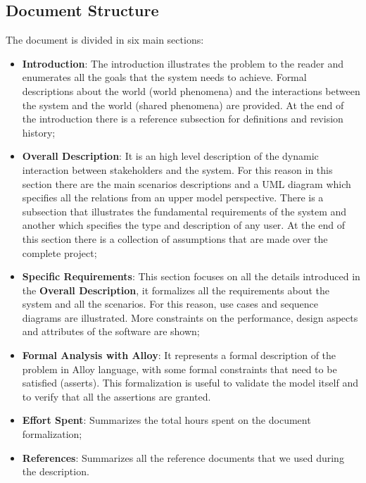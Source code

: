 \subsection{Document Structure}
The document is divided in six main sections:
\begin{itemize}
    \item \textbf{Introduction}: The introduction illustrates the problem to the reader and enumerates all the goals that
          the system needs to achieve. Formal descriptions about the world (world phenomena) and the interactions between the system and the world (shared phenomena) are provided. At the end of the introduction there is a reference subsection for definitions and revision history;
    \item \textbf{Overall Description}: It is an high level description of the dynamic interaction between stakeholders and the system. For this reason in this section there are
          the main scenarios descriptions and a UML diagram which specifies all the relations from an upper model perspective. There is a subsection that illustrates
          the fundamental requirements of the system and another which specifies the type and description of any user. At the end of this section there is a collection of assumptions that are made over the complete project;
    \item \textbf{Specific Requirements}: This section focuses on all the details introduced in the \textbf{Overall Description}, it formalizes all the requirements
          about the system and all the scenarios. For this reason, use cases and sequence diagrams are illustrated. More constraints on the performance, design aspects and attributes of the software are shown;
    \item \textbf{Formal Analysis with Alloy}: It represents a formal description of the problem in Alloy language, with some formal constraints that need to be satisfied (asserts).
          This formalization is useful to validate the model itself and to verify that all the assertions are granted.
    \item \textbf{Effort Spent}: Summarizes the total hours spent on the document formalization;
    \item \textbf{References}: Summarizes all the reference documents that we used during the description.
\end{itemize}
\newpage




\clearpage